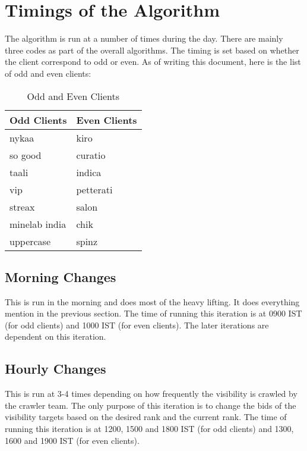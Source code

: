 \section{Timings of the Algorithm}

The algorithm is run at a number of times during the day. There are mainly three codes as part of the overall algorithms. The timing is set based on whether the client correspond to odd or even. As of writing this document, here is the list of odd and even clients:

\begin{table}
    \centering
    \begin{tabular}{|l|l|}
        \hline
        \textbf{Odd Clients} & \textbf{Even Clients} \\ \hline
        nykaa                & kiro                  \\ \hline
        so good              & curatio               \\ \hline
        taali                & indica                \\ \hline
        vip                  & petterati             \\ \hline
        streax               & salon                 \\ \hline
        minelab india        & chik                  \\ \hline
        uppercase            & spinz                 \\ \hline
    \end{tabular}
    \caption{Odd and Even Clients}
    \label{tab:odd_even_clients}
\end{table}

\subsection{Morning Changes}

This is run in the morning and does most of the heavy lifting. It does everything mention in the previous section. The time of running this iteration is at 0900 IST (for odd clients) and 1000 IST (for even clients). The later iterations are dependent on this iteration.

\subsection{Hourly Changes}

This is run at 3-4 times depending on how frequently the visibility is crawled by the crawler team. The only purpose of this iteration is to change the bids of the visibility targets based on the desired rank and the current rank. The time of running this iteration is at 1200, 1500 and 1800 IST (for odd clients) and 1300, 1600 and 1900 IST (for even clients).

